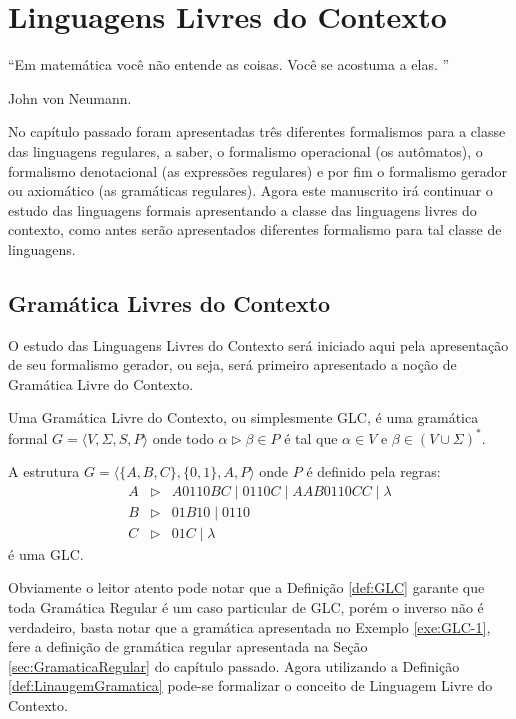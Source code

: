 \chapter{Linguagens Livres do Contexto}\label{cap:LLivresContexto}


\epigraph{``Em matemática você não entende as coisas. Você se acostuma a elas. ''}{John von Neumann.}


No capítulo passado foram apresentadas três diferentes formalismos para a classe das linguagens regulares, a saber, o formalismo operacional (os autômatos), o formalismo denotacional (as expressões regulares) e por fim o formalismo gerador ou axiomático (as gramáticas regulares). Agora este manuscrito irá continuar o estudo das linguagens formais apresentando a classe das linguagens livres do contexto, como antes serão apresentados diferentes formalismo para tal classe de linguagens.

\section{Gramática Livres do Contexto}\label{sec:GLC}

O estudo das Linguagens Livres do Contexto será iniciado aqui pela apresentação de seu formalismo gerador, ou seja, será primeiro apresentado a noção de Gramática Livre do Contexto.

\begin{definition}\label{def:GLC}
\cite{benjaLivro2010} Uma Gramática Livre do Contexto, ou simplesmente GLC, é uma gramática formal $G = \langle V, \Sigma, S, P\rangle$ onde todo $\alpha \rhd \beta \in P$ é tal que $\alpha \in V$ e $\beta \in (V \cup \Sigma)^*$.
\end{definition}

\begin{exem}\label{exe:GLC-1}
	A estrutura $G = \langle \{A, B, C\}, \{0,1\}, A, P\rangle$ onde $P$ é definido pela regras:
	\begin{eqnarray*}
		A & \rhd & A0110BC \mid 0110C \mid AAB0110CC \mid \lambda\\
		B & \rhd & 01B10 \mid 0110\\
		C & \rhd & 01C \mid \lambda
	\end{eqnarray*}
	é uma GLC.
\end{exem}

Obviamente o leitor atento pode notar que a Definição \ref{def:GLC} garante que toda Gramática Regular é um caso particular de GLC, porém o inverso não é verdadeiro, basta notar que a gramática apresentada no Exemplo \ref{exe:GLC-1}, fere a definição de gramática regular apresentada na Seção \ref{sec:GramaticaRegular} do capítulo passado. Agora utilizando a Definição \ref{def:LinaugemGramatica} pode-se formalizar o conceito de Linguagem Livre do Contexto.


